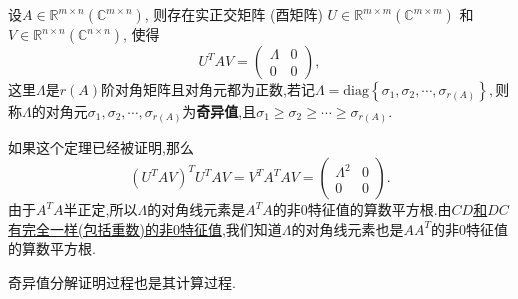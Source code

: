 \documentclass[../../main.tex]{subfiles}%
\begin{document}
\begin{theorem}\label{theorem:奇异值分解}
设\( A \in \mathbb{R}^{m \times n} (\mathbb{C}^{m \times n}) \), 则存在实正交矩阵 (酉矩阵) \( U \in \mathbb{R}^{m \times m} (\mathbb{C}^{m \times m}) \) 和 \( V \in \mathbb{R}^{n \times n} (\mathbb{C}^{n \times n}) \), 使得
\[
U^T A V = \begin{pmatrix}
\Lambda & 0 \\
0 & 0
\end{pmatrix},
\]
这里\( \Lambda \)是\( r(A) \)阶对角矩阵且对角元都为正数,若记$\Lambda=\mathrm{diag}\left\{ \sigma _1,\sigma _2,\cdots ,\sigma _{r\left( A \right)} \right\},$则称$\Lambda $的对角元$\sigma _1,\sigma _2,\cdots ,\sigma _{r\left( A \right)}$为\textbf{奇异值},且$\sigma _1\geqslant \sigma _2\geqslant \cdots \geqslant \sigma _{r\left( A \right)}.$
\end{theorem}
\begin{note}
如果这个定理已经被证明,那么
\[
(U^T A V)^T U^T A V = V^T A^T A V = \begin{pmatrix}
\Lambda^2 & 0 \\
0 & 0
\end{pmatrix}.
\]
由于\( A^T A \)半正定,所以\( \Lambda \)的对角线元素是\( A^T A \)的非0特征值的算数平方根.由\hyperref[theorem:AB和BA的非0特征值的Jordan块完全一致]{\( CD \)和\( DC \)有完全一样(包括重数)的非0特征值},我们知道\( \Lambda \)的对角线元素也是\( AA^T \)的非0特征值的算数平方根.
\end{note}
\begin{remark}
奇异值分解证明过程也是其计算过程.
\end{remark}
\end{document}
